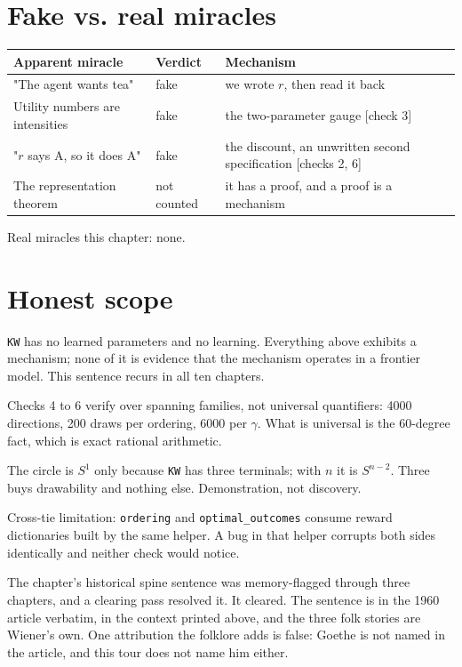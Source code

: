 \section*{Fake vs. real miracles}

\noindent

\noindent
\begin{tabularx}{\textwidth}{XXX}
\toprule
Apparent miracle & Verdict & Mechanism \\
\midrule
"The agent wants tea" & fake & we wrote $r$, then read it back \\
Utility numbers are intensities & fake & the two-parameter gauge [check 3] \\
"$r$ says A, so it does A" & fake & the discount, an unwritten second specification [checks 2, 6] \\
The representation theorem & not counted & it has a proof, and a proof is a mechanism \\
\bottomrule
\end{tabularx}
\par\medskip

Real miracles this chapter: none.

\section*{Honest scope}

\texttt{KW} has no learned parameters and no learning. Everything above exhibits a mechanism; none of it is evidence that the mechanism operates in a frontier model. This sentence recurs in all ten chapters.

Checks 4 to 6 verify over spanning families, not universal quantifiers: 4000 directions, 200 draws per ordering, 6000 per $\gamma$. What is universal is the 60-degree fact, which is exact rational arithmetic.

The circle is $S^1$ only because \texttt{KW} has three terminals; with $n$ it is $S^{n-2}$. Three buys drawability and nothing else. Demonstration, not discovery.

Cross-tie limitation: \texttt{ordering} and \texttt{optimal\_outcomes} consume reward dictionaries built by the same helper. A bug in that helper corrupts both sides identically and neither check would notice.

The chapter's historical spine sentence was memory-flagged through three chapters, and a clearing pass resolved it. It cleared. The sentence is in the 1960 article verbatim, in the context printed above, and the three folk stories are Wiener's own. One attribution the folklore adds is false: Goethe is not named in the article, and this tour does not name him either.

